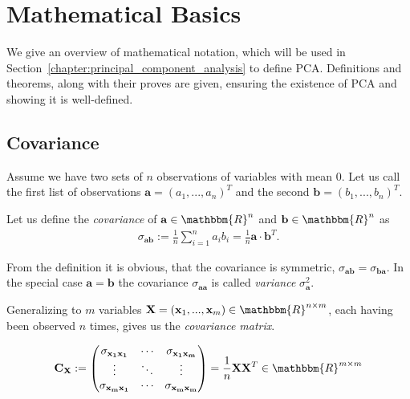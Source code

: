 \chapter{Mathematical Basics}
\label{chapter:mathematical_basics}

We give an overview of mathematical notation, which will be used in Section~\ref{chapter:principal_component_analysis} to define PCA. Definitions and theorems, along with their proves are given, ensuring the existence of PCA and showing it is well-defined.

\section{Covariance}
\label{sec:covariance}

Assume we have two sets of $n$ observations of variables with mean $0$. Let us call the first list of observations $\mathbf{a} = (a_1, ..., a_n)^T$ and the second $\mathbf{b} = (b_1, ..., b_n)^T$.

\begin{definition}[Covariance]
	Let us define the \textit{covariance} of $\mathbf{a} \in \mathbbm{R}^n$ and $\mathbf{b} \in \mathbbm{R}^n$ as
	\begin{align*}
		\sigma_{\mathbf{ab}} := \frac{1}{n} \sum_{i=1}^{n}a_ib_i = \frac{1}{n}\mathbf{a}\cdot\mathbf{b}^T.
	\end{align*}
\end{definition}

From the definition it is obvious, that the covariance is symmetric, $\sigma_{\mathbf{ab}} = \sigma_{\mathbf{ba}}$. In the special case $\mathbf{a} = \mathbf{b}$ the covariance $\sigma_{\mathbf{aa}}$ is called \textit{variance} $\sigma_{\mathbf{a}}^2$.

\begin{definition}
	Generalizing to $m$ variables $\mathbf{X} = (\mathbf{x}_1, ..., \mathbf{x}_m) \in \mathbbm{R}^{n\times m}$, each having been observed $n$ times, gives us the \textit{covariance matrix}.
	
	\begin{align*}
		\mathbf{C_X} := \left(\begin{matrix}
			\sigma_{\mathbf{x_1x_1}}	& \cdots & \sigma_{\mathbf{x_1x_m}}	\\
			\vdots						& \ddots & \vdots					\\
			\sigma_{\mathbf{x_mx_1}}	& \cdots & \sigma_{\mathbf{x_mx_m}}	\\
		\end{matrix}\right) = \frac{1}{n} \mathbf{X}\mathbf{X}^T \in \mathbbm{R}^{m\times m}
	\end{align*}
\end{definition}

